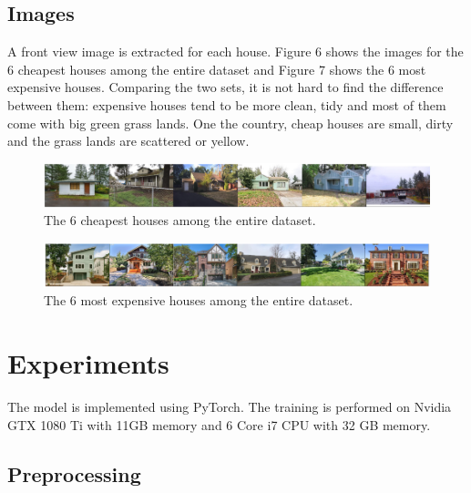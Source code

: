 \documentclass{article} %
\begin{document}
\subsection{Images}

A front view image is extracted for each house.
Figure 6 shows the images for the 6 cheapest houses among the entire dataset
and Figure 7 shows the 6 most expensive houses.
Comparing the two sets, it is not hard to find the difference between them:
expensive houses tend to be more clean, tidy and most of them 
come with big green grass lands.
One the country, cheap houses are small, dirty and
the grass lands are scattered or yellow.

\begin{figure}[h]
	\begin{center}
		\includegraphics[width=1\linewidth]{fig/cheap_img.png}
	\end{center}
	\caption{The 6 cheapest houses among the entire dataset.}
\end{figure}

\begin{figure}[h]
	\begin{center}
		\includegraphics[width=1\linewidth]{fig/exp_img.png}
	\end{center}
	\caption{The 6 most expensive houses among the entire dataset.}
\end{figure}

\section{Experiments}

The model is implemented using PyTorch.
The training is performed on Nvidia GTX 1080 Ti with 11GB memory
and 6 Core i7 CPU with 32 GB memory.

\subsection{Preprocessing}
\end{document}
